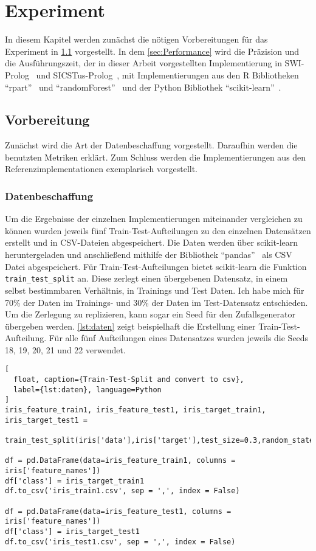 \section{Experiment}
In diesem Kapitel werden zunächst die nötigen Vorbereitungen für das Experiment in \cref{sec:Vorbereitung} vorgestellt.
In dem \cref{sec:Performance} wird die Präzision und die Ausführungszeit, der in dieser Arbeit vorgestellten Implementierung in 
SWI-Prolog~\cite{wielemaker:2011:tplp} und SICSTus-Prolog~\cite{carlsson1988sicstus},
mit Implementierungen aus den R Bibliotheken \enquote{rpart}~\cite{therneau2015package} und \enquote{randomForest}~\cite{rcolorbrewer2018package}
und der Python Bibliothek \enquote{scikit-learn}~\cite{scikit-learn}.

\subsection{Vorbereitung} \label{sec:Vorbereitung}
Zunächst wird die Art der Datenbeschaffung vorgestellt. Daraufhin werden die benutzten Metriken erklärt.
Zum Schluss werden die Implementierungen aus den Referenzimplementationen exemplarisch vorgestellt.

\subsubsection{Datenbeschaffung}
Um die Ergebnisse der einzelnen Implementierungen miteinander vergleichen zu können wurden jeweils fünf Train-Test-Aufteilungen
zu den einzelnen Datensätzen erstellt und in CSV-Dateien abgespeichert. Die Daten werden über scikit-learn heruntergeladen
und anschließend mithilfe der Bibliothek \enquote{pandas}~\cite{mckinney2011pandas} als CSV Datei abgespeichert.
Für Train-Test-Aufteilungen bietet scikit-learn die Funktion \texttt{train\_test\_split} an. Diese zerlegt einen übergebenen
Datensatz, in einem selbst bestimmbaren Verhältnis, in Trainings und Test Daten. Ich habe mich für 70\% der Daten
im Trainings- und 30\% der Daten im Test-Datensatz entschieden. Um die Zerlegung zu replizieren,
kann sogar ein Seed für den Zufallsgenerator übergeben werden. \cref{lst:daten} zeigt beispielhaft die Erstellung
einer Train-Test-Aufteilung. Für alle fünf Aufteilungen eines Datensatzes wurden jeweils die Seeds 18, 19, 20, 21 und 22 verwendet.
\begin{lstlisting}[
  float, caption={Train-Test-Split and convert to csv},
  label={lst:daten}, language=Python
]
iris_feature_train1, iris_feature_test1, iris_target_train1, iris_target_test1 =
        train_test_split(iris['data'],iris['target'],test_size=0.3,random_state=18)

df = pd.DataFrame(data=iris_feature_train1, columns = iris['feature_names'])
df['class'] = iris_target_train1
df.to_csv('iris_train1.csv', sep = ',', index = False)

df = pd.DataFrame(data=iris_feature_test1, columns = iris['feature_names'])
df['class'] = iris_target_test1
df.to_csv('iris_test1.csv', sep = ',', index = False)
\end{lstlisting}

